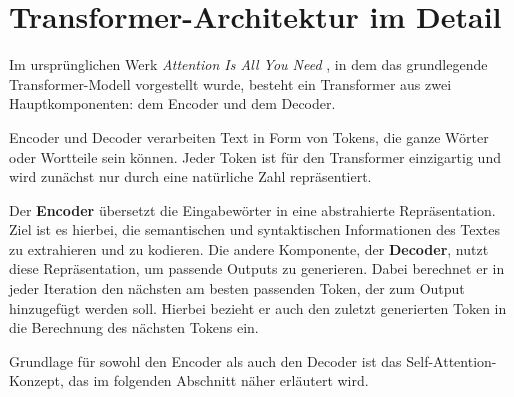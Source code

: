 \chapter{Transformer-Architektur im Detail}

Im ursprünglichen Werk \textit{Attention Is All You Need} , in dem das grundlegende Transformer-Modell vorgestellt wurde, besteht ein Transformer aus zwei Hauptkomponenten: 
dem Encoder und dem Decoder.

Encoder und Decoder verarbeiten Text in Form von Tokens, die ganze Wörter oder Wortteile sein können. 
Jeder Token ist für den Transformer einzigartig und wird zunächst nur durch eine natürliche Zahl repräsentiert.

Der \textbf{Encoder} übersetzt die Eingabewörter in eine abstrahierte Repräsentation.  
Ziel ist es hierbei, die semantischen und syntaktischen Informationen des Textes zu extrahieren und zu kodieren.  
Die andere Komponente, der \textbf{Decoder}, nutzt diese Repräsentation, um passende Outputs zu generieren. 
Dabei berechnet er in jeder Iteration den nächsten am besten passenden Token, der zum Output hinzugefügt werden soll. 
Hierbei bezieht er auch den zuletzt generierten Token in die Berechnung des nächsten Tokens ein.

Grundlage für sowohl den Encoder als auch den Decoder ist das Self-Attention-Konzept, das im folgenden Abschnitt näher erläutert wird.

